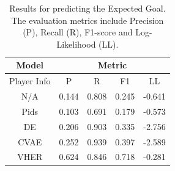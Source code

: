 \documentclass[letterpaper]{article} %
\begin{document}
\begin{table}[htbp]
    \centering
        \begin{tabular}{c|cccc}
        \hline
        Model & \multicolumn{4}{c}{Metric} \\ \hline
        Player Info  & P & R & F1 & LL \\ \hline
         N/A  & 0.144 & 0.808& 0.245 & -0.641  \\
        Pids  & 0.103 & 0.691 & 0.179 & -0.573 \\
        DE  & 0.206 & 0.903 & 0.335 & -2.756 \\
        CVAE  & 0.252 & 0.939 & 0.397 & -2.589 \\
        VHER  & 0.624 & 0.846 & 0.718 & -0.281  \\ \hline
        \end{tabular}
        \caption{Results for predicting the Expected Goal. The evaluation metrics include Precision (P), Recall (R), F1-score and Log-Likelihood (LL). }
        \label{table:exp-eg}
\end{table}
\end{document}
